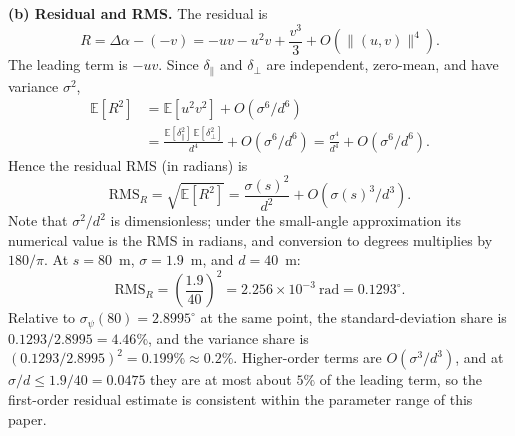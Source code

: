 \noindent\textbf{(b) Residual and RMS.} The residual is
\begin{equation}
  R=\Delta\alpha-(-v)=-uv-u^2v+\frac{v^3}{3}+O(\|(u,v)\|^4).
\end{equation}
The leading term is $-uv$. Since $\delta_\parallel$ and $\delta_\perp$ are independent, zero-mean, and have variance $\sigma^2$,
\begin{equation}
\begin{split}
  \mathbb{E}[R^2]&=\mathbb{E}[u^2v^2]+O(\sigma^6/d^6)\\
  &=\frac{\mathbb{E}[\delta_\parallel^2]\,\mathbb{E}[\delta_\perp^2]}{d^4}+O(\sigma^6/d^6)
  =\frac{\sigma^4}{d^4}+O(\sigma^6/d^6).
\end{split}
\end{equation}
Hence the residual RMS (in radians) is
\begin{equation}
  \mathrm{RMS}_R=\sqrt{\mathbb{E}[R^2]}=\frac{\sigma(s)^2}{d^2}+O(\sigma(s)^3/d^3).
\end{equation}
Note that $\sigma^2/d^2$ is dimensionless; under the small-angle approximation its numerical value is the RMS in radians, and conversion to degrees multiplies by $180/\pi$. At $s=80$~m, $\sigma=1.9$~m, and $d=40$~m:
\begin{equation}
  \mathrm{RMS}_R=\left(\frac{1.9}{40}\right)^2=2.256\times10^{-3}~\mathrm{rad}=0.1293^\circ.
\end{equation}
Relative to $\sigma_\psi(80)=2.8995^\circ$ at the same point, the standard-deviation share is $0.1293/2.8995=4.46\%$, and the variance share is $(0.1293/2.8995)^2=0.199\%\approx0.2\%$. Higher-order terms are $O(\sigma^3/d^3)$, and at $\sigma/d\le1.9/40=0.0475$ they are at most about $5\%$ of the leading term, so the first-order residual estimate is consistent within the parameter range of this paper.

